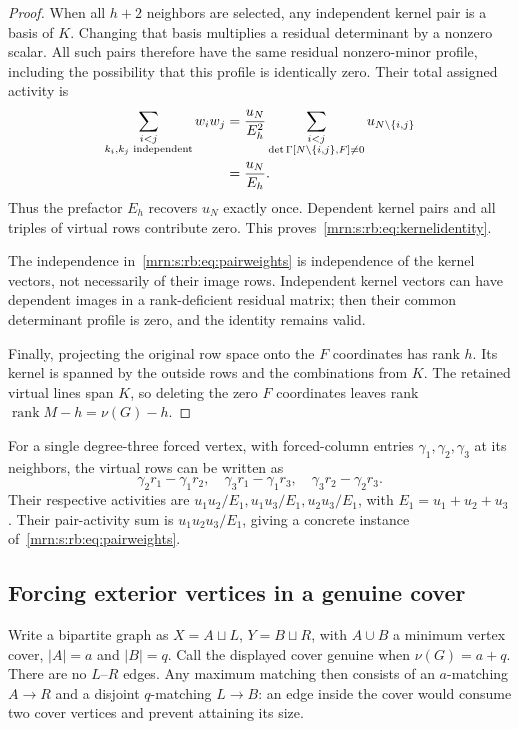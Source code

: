 \documentclass[11pt,a4paper]{article}
\theoremstyle{remark}\newtheorem{remark}[theorem]{Remark}
\newcommand{\rank}{\operatorname{rank}}    %
\begin{document}
\begin{proof}
When all $h+2$ neighbors are selected, any independent kernel pair is a basis of $K$. Changing that basis multiplies a residual determinant by a nonzero scalar. All such pairs therefore have the same residual nonzero-minor profile, including the possibility that this profile is identically zero. Their total assigned activity is
\begin{align}
 \sum_{\substack{i<j\\k_i,k_j\text{ independent}}}w_iw_j
 &=\frac{u_N}{E_h^2}
   \sum_{\substack{i<j\\\det\Gamma[N\setminus\{i,j\},F]\ne0}}
        u_{N\setminus\{i,j\}}\notag\\
 &=\frac{u_N}{E_h}.\label{mrn:s:rb:eq:pairweights}
\end{align}
Thus the prefactor $E_h$ recovers $u_N$ exactly once. Dependent kernel pairs and all triples of virtual rows contribute zero. This proves~\eqref{mrn:s:rb:eq:kernelidentity}.

The independence in~\eqref{mrn:s:rb:eq:pairweights} is independence of the kernel vectors, not necessarily of their image rows. Independent kernel vectors can have dependent images in a rank-deficient residual matrix; then their common determinant profile is zero, and the identity remains valid.

Finally, projecting the original row space onto the $F$ coordinates has rank $h$. Its kernel is spanned by the outside rows and the combinations from $K$. The retained virtual lines span $K$, so deleting the zero $F$ coordinates leaves rank $\rank M-h=\nu(G)-h$.
\end{proof}

For a single degree-three forced vertex, with forced-column entries $\gamma_1,\gamma_2,\gamma_3$ at its neighbors, the virtual rows can be written as
\[
 \gamma_2r_1-\gamma_1r_2,\quad
 \gamma_3r_1-\gamma_1r_3,\quad
 \gamma_3r_2-\gamma_2r_3.
\]
Their respective activities are $u_1u_2/E_1,u_1u_3/E_1,u_2u_3/E_1$, with $E_1=u_1+u_2+u_3$. Their pair-activity sum is $u_1u_2u_3/E_1$, giving a concrete instance of~\eqref{mrn:s:rb:eq:pairweights}.

\subsection{Forcing exterior vertices in a genuine cover}
Write a bipartite graph as $X=A\sqcup L$, $Y=B\sqcup R$, with $A\cup B$ a minimum vertex cover, $|A|=a$ and $|B|=q$. Call the displayed cover genuine when $\nu(G)=a+q$. There are no $L$--$R$ edges. Any maximum matching then consists of an $a$-matching $A\to R$ and a disjoint $q$-matching $L\to B$: an edge inside the cover would consume two cover vertices and prevent attaining its size.
\end{document}
